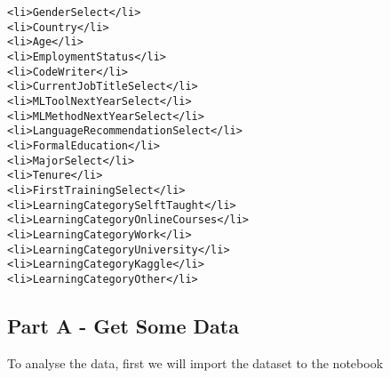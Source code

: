 \documentclass[11pt]{article}
\begin{document}
\begin{verbatim}
<li>GenderSelect</li>
<li>Country</li>
<li>Age</li>
<li>EmploymentStatus</li>
<li>CodeWriter</li>
<li>CurrentJobTitleSelect</li>
<li>MLToolNextYearSelect</li>
<li>MLMethodNextYearSelect</li>
<li>LanguageRecommendationSelect</li>
<li>FormalEducation</li>
<li>MajorSelect</li>
<li>Tenure</li>
<li>FirstTrainingSelect</li>
<li>LearningCategorySelftTaught</li>
<li>LearningCategoryOnlineCourses</li>
<li>LearningCategoryWork</li>
<li>LearningCategoryUniversity</li>
<li>LearningCategoryKaggle</li>
<li>LearningCategoryOther</li>
\end{verbatim}

    \subsection{Part A - Get Some Data}\label{part-a---get-some-data}

    To analyse the data, first we will import the dataset to the notebook
\end{document}
